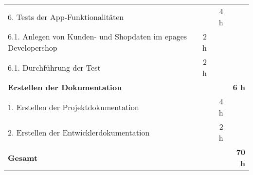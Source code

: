\begin{tabularx}{\textwidth}{Xrrr}
6. Tests der App-Funktionalitäten &       & 4 h   &  \\
\rowcolor{odd}6.1. Anlegen von Kunden- und Shopdaten im epages Developershop & 2 h   &       &  \\
6.1. Durchführung der Test & 2 h   &       &  \\
\rowcolor{heading}\textbf{Erstellen der Dokumentation} & \textbf{} & \textbf{} & \textbf{6 h} \\
1. Erstellen der Projektdokumentation &       & 4 h   &  \\
\rowcolor{odd}2. Erstellen der Entwicklerdokumentation &       & 2 h   &  \\
\hline
\hline
\rowcolor{heading}\textbf{Gesamt} & \textbf{} & \textbf{} & \textbf{70 h} \\
\end{tabularx}
